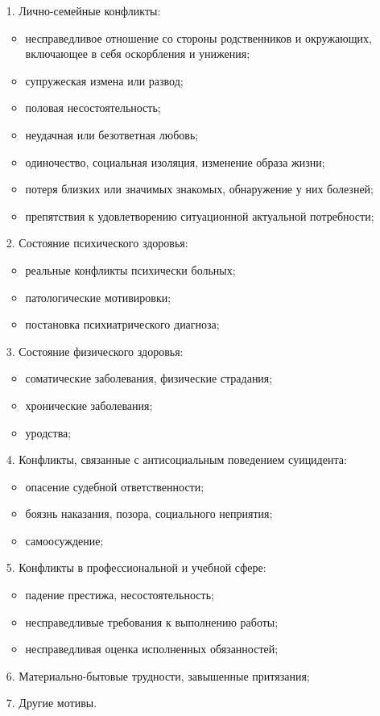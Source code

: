 \begin{enumerate}
	\item[1.] Лично-семейные конфликты:
	\begin{itemize}
		\item несправедливое отношение со стороны родственников и окружающих, включающее в себя оскорбления и унижения;
		\item супружеская измена или развод;
		\item половая несостоятельность;
		\item неудачная или безответная любовь;
		\item одиночество, социальная изоляция, изменение образа жизни;
		\item потеря близких или значимых знакомых, обнаружение у них болезней;
		\item препятствия к удовлетворению ситуационной актуальной потребности;
	\end{itemize}

	\item[2.] Состояние психического здоровья:
	\begin{itemize}
		\item реальные конфликты психически больных;
		\item патологические мотивировки;
		\item постановка психиатрического диагноза;
	\end{itemize}

	\item[3.] Состояние физического здоровья:
	\begin{itemize}
		\item соматические заболевания, физические страдания;
		\item хронические заболевания;
		\item уродства;
	\end{itemize}

	\item[4.] Конфликты, связанные с антисоциальным поведением суицидента:
	\begin{itemize}
		\item опасение судебной ответственности;
		\item боязнь наказания, позора, социального неприятия;
		\item самоосуждение;
	\end{itemize}

	\item[5.] Конфликты в профессиональной и учебной сфере:
	\begin{itemize}
		\item падение престижа, несостоятельность;
		\item несправедливые требования к выполнению работы;
		\item несправедливая оценка исполненных обязанностей;
	\end{itemize}

	\item[6.] Материально-бытовые трудности, завышенные притязания;

	\item[7.] Другие мотивы.
\end{enumerate}

